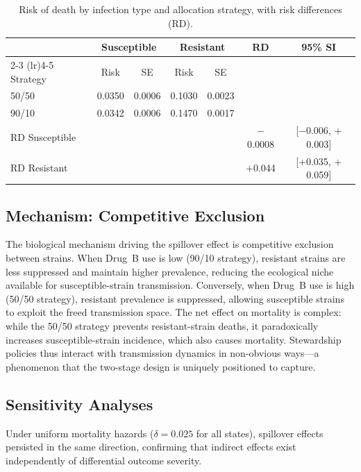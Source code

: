\documentclass[12pt]{article}
\begin{document}
\begin{table}[htbp]
\centering
\caption{Risk of death by infection type and allocation strategy, with risk differences (RD).}
\label{tab:risk_summary}
{\small
\begin{tabular}{lcccccc}
\toprule
& \multicolumn{2}{c}{Susceptible} & \multicolumn{2}{c}{Resistant} &
\multirow{2}{*}{RD} & \multirow{2}{*}{95\% SI} \\
\cmidrule(lr){2-3} \cmidrule(lr){4-5}
Strategy & Risk & SE & Risk & SE &  &  \\
\midrule
50/50 & 0.0350 & 0.0006 & 0.1030 & 0.0023 &  &  \\
90/10 & 0.0342 & 0.0006 & 0.1470 & 0.0017 &  &  \\
\midrule
RD Susceptible &  &  &  &  & $-$0.0008 & [$-$0.006, $+$0.003] \\
RD Resistant &  &  &  &  & $+$0.044 & [$+$0.035, $+$0.059] \\
\bottomrule
\end{tabular}
}
\end{table}

\subsection*{Mechanism: Competitive Exclusion}

The biological mechanism driving the spillover effect is competitive exclusion between strains. When Drug~B use is low (90/10 strategy), resistant strains are less suppressed and maintain higher prevalence, reducing the ecological niche available for susceptible-strain transmission. Conversely, when Drug~B use is high (50/50 strategy), resistant prevalence is suppressed, allowing susceptible strains to exploit the freed transmission space. The net effect on mortality is complex: while the 50/50 strategy prevents resistant-strain deaths, it paradoxically increases susceptible-strain incidence, which also causes mortality. Stewardship policies thus interact with transmission dynamics in non-obvious ways---a phenomenon that the two-stage design is uniquely positioned to capture.

\subsection*{Sensitivity Analyses}

Under uniform mortality hazards ($\delta = 0.025$ for all states), spillover effects persisted in the same direction, confirming that indirect effects exist independently of differential outcome severity.
\end{document}
